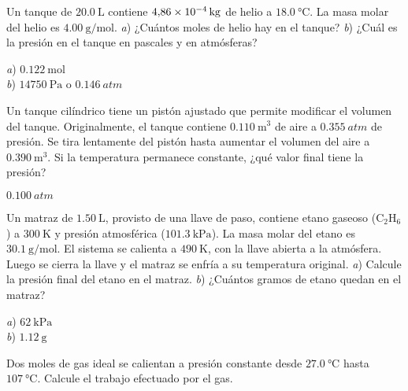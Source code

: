\setcounter{figure}{0}
%
\begin{Exercise}
  Un tanque de $\SI{20.0}{\liter}$ contiene $\SI{4.86E-4}{\kilogram}$ de helio a $\SI{18.0}{\celsius}$. La masa molar del helio es $\SI{4.00}{\gram/\mole}$. \textit{a}) ¿Cuántos moles de helio hay en el tanque? \textit{b}) ¿Cuál es la presión en el tanque en pascales y en atmósferas?
\end{Exercise}
\begin{Answer}
	\begin{minipage}[t]{.4\textwidth}
    \textit{a}) $\SI{0.122}{\mole}$\\ \textit{b}) $\SI{14750}{\pascal}$ o $\SI{0.146}{atm}$
  \end{minipage}
\end{Answer}
%
\begin{Exercise}
  {}{}
  Un tanque cilíndrico tiene un pistón ajustado que permite modificar el volumen del tanque. Originalmente, el tanque contiene $\SI{0.110}{\cubic\metre}$ de aire a $\SI{0.355}{atm}$ de presión. Se tira lentamente del pistón hasta aumentar el volumen del aire a $\SI{0.390}{\cubic\metre}$. Si la temperatura permanece constante, ¿qué valor final tiene la presión?
\end{Exercise}
\begin{Answer}
  $\SI{0.100}{atm}$
\end{Answer}
%
\begin{Exercise}
  Un matraz de $\SI{1.50}{\liter}$, provisto de una llave de paso, contiene etano gaseoso ($\text{C}_2\text{H}_6$) a $\SI{300}{\kelvin}$ y presión atmosférica ($\SI{101.3}{\kilo\pascal}$). La masa molar del etano es $\SI{30.1}{\gram/\mole}$. El sistema se calienta a $\SI{490}{\kelvin}$, con la llave abierta a la atmósfera. Luego se cierra la llave y el matraz se enfría a su temperatura  original. \textit{a}) Calcule la presión final del etano en el matraz. \textit{b}) ¿Cuántos gramos de etano quedan en el matraz?
\end{Exercise}
\begin{Answer}
	\begin{minipage}[t]{.4\textwidth}
    \textit{a}) $\SI{62}{\kilo\pascal}$\\ \textit{b}) $\SI{1.12}{\gram}$
  \end{minipage}
\end{Answer}
%
\begin{Exercise}
  Dos moles de gas ideal se calientan a presión constante desde $\SI{27.0}{\celsius}$ hasta $\SI{107}{\celsius}$. Calcule el trabajo efectuado por el gas.
\end{Exercise}
